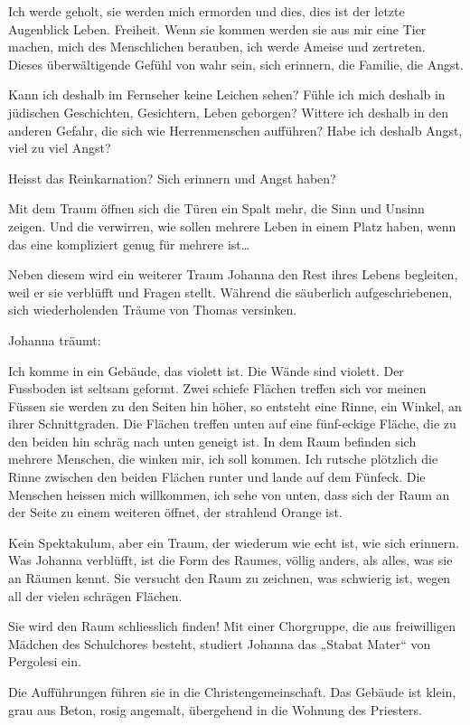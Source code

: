 \documentclass[10pt,titlepage,a5paper]{book}
\begin{document}
Ich werde geholt, sie werden mich ermorden und dies, dies ist der letzte Augenblick Leben. Freiheit. Wenn sie kommen werden sie aus mir eine Tier machen, mich des Menschlichen berauben, ich werde Ameise und zertreten.
Dieses überwältigende Gefühl von wahr sein, sich erinnern, die Familie, die Angst.

Kann ich deshalb im Fernseher keine Leichen sehen? Fühle ich mich deshalb in jüdischen Geschichten, Gesichtern, Leben geborgen?  Wittere ich deshalb in den anderen Gefahr, die sich wie Herrenmenschen aufführen? Habe ich deshalb Angst, viel zu viel Angst? 

Heisst das Reinkarnation? Sich erinnern und Angst haben?

Mit dem Traum öffnen sich die Türen ein Spalt mehr, die Sinn und Unsinn zeigen. Und die verwirren, wie sollen mehrere Leben in einem Platz haben, wenn das eine kompliziert genug für mehrere ist\dots 

Neben diesem wird ein weiterer Traum Johanna den Rest ihres Lebens begleiten, weil er sie verblüfft und Fragen stellt. Während die säuberlich aufgeschriebenen, sich wiederholenden Träume von Thomas versinken.

Johanna träumt:

Ich komme in ein Gebäude, das violett ist. Die Wände sind violett. Der Fussboden ist seltsam geformt. Zwei schiefe Flächen treffen sich vor meinen Füssen sie werden zu den Seiten hin höher, so entsteht eine Rinne, ein Winkel, an ihrer Schnittgraden. Die Flächen treffen unten auf eine fünf-eckige Fläche, die zu den beiden hin schräg nach unten geneigt ist. In dem Raum befinden sich mehrere Menschen,  die winken mir, ich soll kommen. Ich rutsche plötzlich die Rinne zwischen den beiden Flächen runter und lande auf dem Fünfeck. Die Menschen heissen mich willkommen, ich sehe von unten, dass sich der Raum an der Seite zu einem weiteren öffnet, der strahlend Orange ist.

 Kein Spektakulum, aber ein Traum, der wiederum wie echt ist, wie sich erinnern. Was Johanna verblüfft, ist die Form des Raumes, völlig anders, als alles, was sie an Räumen kennt. Sie versucht den Raum zu zeichnen, was schwierig ist, wegen all der vielen schrägen Flächen.
 
Sie wird den Raum schliesslich finden! Mit einer Chorgruppe, die aus freiwilligen Mädchen des Schulchores besteht, studiert Johanna das „Stabat Mater“ von Pergolesi ein. 

Die Aufführungen führen sie in die Christengemeinschaft. Das Gebäude ist klein, grau aus Beton, rosig angemalt, übergehend in die Wohnung des Priesters.
\end{document}
